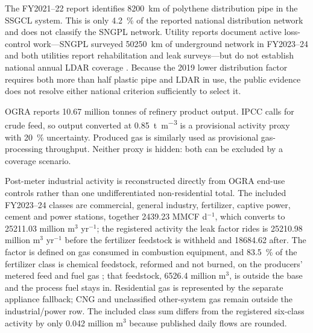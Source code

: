 The FY2021--22 report identifies \SI{8200}{\kilo\metre} of polythene distribution pipe in the
SSGCL system. This is only \SI{4.2}{\percent} of the reported national distribution network and
does not classify the SNGPL network. Utility reports document active loss-control work---SNGPL
surveyed \SI{50250}{\kilo\metre} of underground network in FY2023--24 and both utilities report
rehabilitation and leak surveys---but do not establish national annual LDAR coverage
\citep{sngpl2024,ssgc2024}. Because the
2019 lower distribution factor requires both more than half plastic pipe and LDAR in use, the
public evidence does not resolve either national criterion sufficiently to select it.

OGRA reports \num{10.67} million tonnes of refinery product output. IPCC calls for crude feed,
so output converted at \SI{0.85}{\tonne\per\cubic\metre} is a provisional activity proxy with
\SI{20}{\percent} uncertainty. Produced gas is similarly used as provisional gas-processing
throughput. Neither proxy is hidden: both can be excluded by a coverage scenario.

Post-meter industrial activity is reconstructed directly from OGRA end-use controls rather than
one undifferentiated non-residential total. The included FY2023--24 classes are commercial,
general industry, fertilizer, captive power, cement and power stations, together
\num{2439.23} MMCF d$^{-1}$, which converts to \num{25211.03} million m$^3$ yr$^{-1}$;
the registered activity the leak factor rides is \num{25210.98} million m$^3$ yr$^{-1}$
before the fertilizer feedstock is withheld and \num{18684.62} after. The factor is defined
on gas consumed in combustion equipment, and \SI{83.5}{\percent} of the fertilizer class is
chemical feedstock, reformed and not burned, on the producers' metered feed and fuel gas
\citep{nfdc2025}; that feedstock, \num{6526.4} million m$^3$, is outside the base and the
process fuel stays in. Residential gas is
represented by the separate appliance fallback; CNG and unclassified other-system gas remain
outside the industrial/power row. The included class sum differs from the registered six-class
activity by only \num{0.042} million m$^3$ because published daily flows are rounded.

